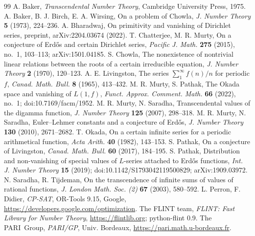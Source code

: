 \documentclass[11pt]{amsart}
\theoremstyle{definition}
\theoremstyle{remark}
\numberwithin{equation}{section}
\begin{document}
\begin{thebibliography}{99}
 A. Baker, \emph{Transcendental Number Theory}, Cambridge University Press, 1975.
 A. Baker, B. J. Birch, E. A. Wirsing, On a problem of Chowla, \emph{J. Number Theory} \textbf{5} (1973), 224--236.
 A. Bharadwaj, On primitivity and vanishing of Dirichlet series, preprint, arXiv:2204.03674 (2022).
 T. Chatterjee, M. R. Murty, On a conjecture of Erd\H{o}s and certain Dirichlet series, \emph{Pacific J. Math.} \textbf{275} (2015), no.~1, 103--113; arXiv:1501.04185.
 S. Chowla, The nonexistence of nontrivial linear relations between the roots of a certain irreducible equation, \emph{J. Number Theory} \textbf{2} (1970), 120--123.
 A. E. Livingston, The series $\sum_1^\infty f(n)/n$ for periodic $f$, \emph{Canad. Math. Bull.} \textbf{8} (1965), 413--432.
 M. R. Murty, S. Pathak, The Okada space and vanishing of $L(1,f)$, \emph{Funct. Approx. Comment. Math.} \textbf{66} (2022), no.~1; doi:10.7169/facm/1952.
 M. R. Murty, N. Saradha, Transcendental values of the digamma function, \emph{J. Number Theory} \textbf{125} (2007), 298--318.
 M. R. Murty, N. Saradha, Euler--Lehmer constants and a conjecture of Erd\H{o}s, \emph{J. Number Theory} \textbf{130} (2010), 2671--2682.
 T. Okada, On a certain infinite series for a periodic arithmetical function, \emph{Acta Arith.} \textbf{40} (1982), 143--153.
 S. Pathak, On a conjecture of Livingston, \emph{Canad. Math. Bull.} \textbf{60} (2017), 184--195.
 S. Pathak, Distribution and non-vanishing of special values of $L$-series attached to Erd\H{o}s functions, \emph{Int. J. Number Theory} \textbf{15} (2019); doi:10.1142/S1793042119500829; arXiv:1909.03972.
 N. Saradha, R. Tijdeman, On the transcendence of infinite sums of values of rational functions, \emph{J. London Math. Soc. (2)} \textbf{67} (2003), 580--592.
 L. Perron, F. Didier, \emph{CP-SAT}, OR-Tools 9.15, Google, \url{https://developers.google.com/optimization}.
 The FLINT team, \emph{FLINT: Fast Library for Number Theory}, \url{https://flintlib.org}; python-flint 0.9.
 The PARI~Group, \emph{PARI/GP}, Univ. Bordeaux, \url{https://pari.math.u-bordeaux.fr}.
\end{thebibliography}
\end{document}
